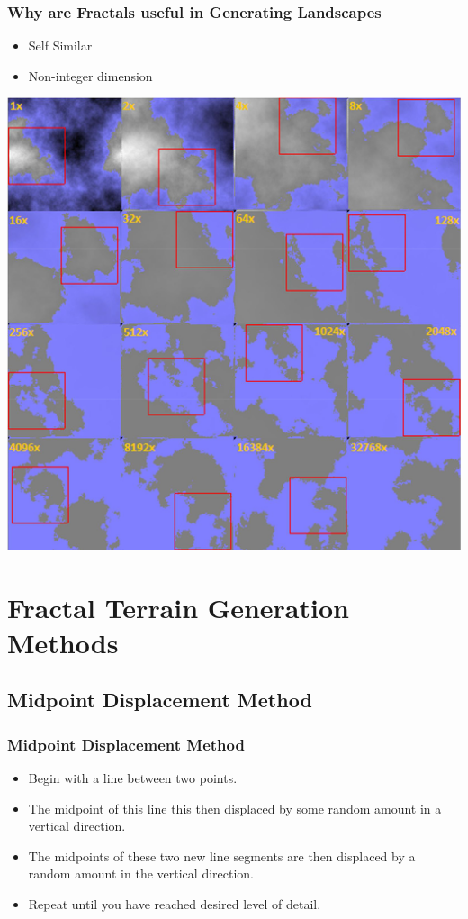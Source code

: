 \documentclass{beamer}
\begin{document}
\begin{frame}
\frametitle{Why are Fractals useful in Generating Landscapes}
\begin{itemize}
\item Self Similar
\item Non-integer dimension
\end{itemize}
\begin{center}
\includegraphics[scale=0.13]{SelfSimilarity.jpg}
\end{center}
\end{frame}


\section{Fractal Terrain Generation Methods}
\subsection{Midpoint Displacement Method}

\begin{frame}
  \frametitle{Midpoint Displacement Method}
\begin{itemize}
\item Begin with a line between two points.
\item  The midpoint of this line this then displaced by some random amount in a vertical direction.
\item The midpoints of these two new line segments are then displaced by a random amount in the vertical direction.
\item Repeat until you have reached desired level of detail.
\end{itemize}
\end{frame}
\end{document}
